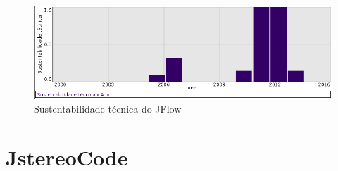 \begin{figure}[h]
  \center
  \includegraphics[scale=0.50]{imagens/softwares-charts/jflow.png}
  \caption{Sustentabilidade técnica do JFlow}
\end{figure}


\section{JstereoCode}


